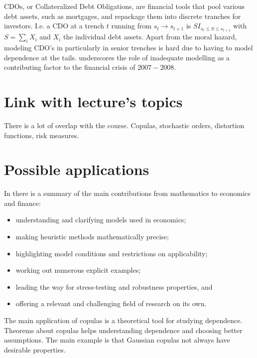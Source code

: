 \documentclass[a4paper,12pt]{article}
\begin{document}
CDOs, or Collateralized Debt Obligations, are financial tools that pool various debt assets,
such as mortgages, and repackage them into discrete tranches for investors.
I.e. a CDO at a trench $t$ running from $s_{t} \rightarrow s_{t+1}$ is
$S I_{s_{t} \le S \le s_{t+1}}$ with $S = \sum_{i} X_{i}$ and $X_{i}$ the
individual debt assets. Apart from the moral hazard,  modeling CDO's in particularly
in senior trenches is hard due to having to model dependence at the tails.
\cite{donnelly_devil_nodate} underscores the role of inadequate modelling as
a contributing factor to the financial crisis of $2007-2008$.

\section{Link with lecture's topics}

There is a lot of overlap with the course. Copulas, stochastic orders, distortion functions, risk measures.

\section{Possible applications}
In \cite{donnelly_devil_nodate} there is a summary of the main contributions
from mathematics to economics and finance:
\begin{itemize}
    \item  understanding and clarifying models used in economics;
    \item  making heuristic methods mathematically precise;
    \item  highlighting model conditions and restrictions on applicability;
    \item  working out numerous explicit examples;
    \item  leading the way for stress-testing and robustness properties, and
    \item  offering a relevant and challenging field of research on its own.
\end{itemize}

The main application of copulas is a theoretical tool for studying dependence.
Theorems about copulas helps understanding dependence and choosing better assumptions.
The main example is that Gaussian copulas not always have desirable properties.


\newpage
\printbibliography
\end{document}
